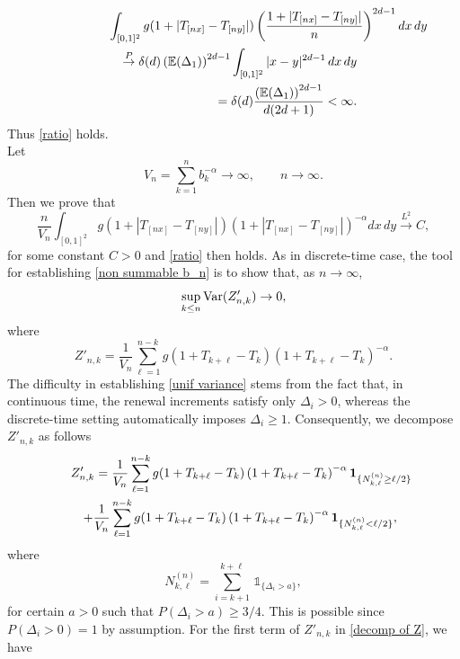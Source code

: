\documentclass[preprint,12pt]{article}
\newcommand{\ind}[1]{\,\mathds{1}_{\{#1\}}}
\newcommand{\Var}{{\rm Var}}
\begin{document}
\begin{eqnarray}\label{finite moment}
\lefteqn{
\int_{[0,1]^2}
g(1+|T_{[nx]}-T_{[ny]}|)\left(
\frac{1+|T_{[nx]}-T_{[ny]}|}
{n}
\right)^{2d-1}
dx\,dy
}\nonumber\\
&&\overset{P}{\to}
\delta(d)\left(\mathbb{E}(\Delta_1)\right)^{2d-1}
\int_{[0,1]^2}|x-y|^{2d-1}\,dx\,dy\nonumber\\
&&
=\delta(d)
\frac{\left(\mathbb{E}(\Delta_1)\right)^{2d-1}}
{d(2d+1)}
<
\infty.
\end{eqnarray}
Thus \eqref{ratio} holds.\\
\medskip
{}
Let
\begin{equation}\label{V_n}
V_n
=
\sum_{k=1}^n b_k^{-\alpha}
\to\infty,
\qquad n\to\infty.
\end{equation}
Then we prove that
\begin{equation}\label{non summable b_n}
\frac{n}{V_n}
\int_{[0,1]^2}
g(1+|T_{[nx]}-T_{[ny]}|)\left(1+|T_{[nx]}-T_{[ny]}|\right)^{-\alpha}
dx\,dy
\overset{L^2}{\longrightarrow}
C,
\end{equation}
for some constant $C>0$ and  \eqref{ratio} then holds.
As in discrete-time case, the tool for establishing \eqref{non summable b_n} is to show that, as $n\to\infty$,
\begin{equation}\label{unif variance}
\sup_{k\le n}\Var(Z'_{n,k})
\to0,
\end{equation}
where
$$
Z'_{n,k}
=
\frac{1}{V_n}
\sum_{\ell=1}^{n-k}
g(1+T_{k+\ell}-T_k)\left(1+T_{k+\ell}-T_k\right)^{-\alpha}.
$$
The difficulty in establishing \eqref{unif variance} stems from the fact that, in continuous time, the renewal
increments satisfy only $\Delta_i>0$, whereas the discrete-time setting
automatically imposes $\Delta_i\ge1$. Consequently, 
we decompose $Z'_{n,k}$ as follows
\begin{eqnarray}\label{decomp of Z}\lefteqn{
Z'_{n,k}=
\frac{1}{V_n}
\sum_{\ell=1}^{n-k}
g(1+T_{k+\ell}-T_k)\left(1+T_{k+\ell}-T_k\right)^{-\alpha}
\mathbf 1_{\{N_{k,\ell}^{(n)}\ge\ell/2\}}}\nonumber\\
&&+
\frac{1}{V_n}
\sum_{\ell=1}^{n-k}
g(1+T_{k+\ell}-T_k)\left(1+T_{k+\ell}-T_k\right)^{-\alpha}
\mathbf 1_{\{N_{k,\ell}^{(n)}<\ell/2\}},
\end{eqnarray}
where
$$
N_{k,\ell}^{(n)}=\sum_{i=k+1}^{k+\ell}\ind{\Delta_i>a},
$$
for certain $a>0$ such that $P(\Delta_i>a)\ge3/4.$ This is possible since $P(\Delta_i>0)=1$ by assumption.
For the first term of $Z'_{n,k}$ in \eqref{decomp of Z}, we have
\end{document}
